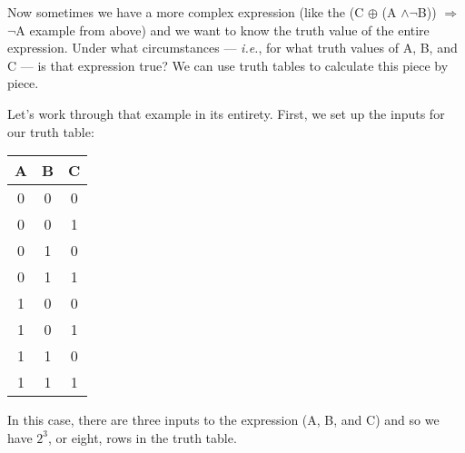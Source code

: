 Now sometimes we have a more complex expression (like the (C $\oplus$ (A
$\wedge \neg$B)) $\Rightarrow$ $\neg$A example from above) and we want to
know the truth value of the entire expression. Under what circumstances ---
\textit{i.e.}, for what truth values of A, B, and C --- is that expression
true? We can use truth tables to calculate this piece by piece.

Let's work through that example in its entirety. First, we set up the
inputs for our truth table:
\begin{nobreak}
\begin{center}
\begin{tabular}{c c c|}
A & B & C \\
\hline
0 & 0 & 0 \\
0 & 0 & 1 \\
0 & 1 & 0 \\
0 & 1 & 1 \\
1 & 0 & 0 \\
1 & 0 & 1 \\
1 & 1 & 0 \\
1 & 1 & 1 \\
\end{tabular}
\end{center}
\end{nobreak}
In this case, there are three inputs to the expression (A, B, and C) and so
we have $2^3$, or eight, rows in the truth table.

